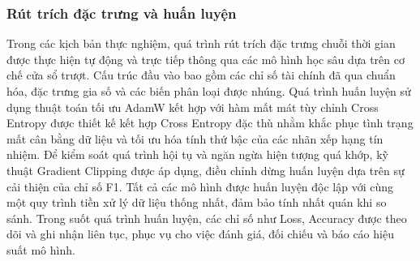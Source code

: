 \documentclass[10pt,twoside]{article}
\begin{document}
\subsubsection{Rút trích đặc trưng và huấn luyện}
Trong các kịch bản thực nghiệm, quá trình rút trích đặc trưng chuỗi thời gian được thực hiện tự động và trực tiếp thông qua các mô hình học sâu dựa trên cơ chế cửa sổ trượt. Cấu trúc đầu vào bao gồm các chỉ số tài chính đã qua chuẩn hóa, đặc trưng gia số và các biến phân loại được nhúng. Quá trình huấn luyện sử dụng thuật toán tối ưu AdamW kết hợp với hàm mất mát tùy chỉnh Cross Entropy được thiết kế kết hợp Cross Entropy đặc thù nhằm khắc phục tình trạng mất cân bằng dữ liệu và tối ưu hóa tính thứ bậc của các nhãn xếp hạng tín nhiệm. Để kiểm soát quá trình hội tụ và ngăn ngừa hiện tượng quá khớp, kỹ thuật Gradient Clipping được áp dụng, điều chỉnh dừng huấn luyện dựa trên sự cải thiện của chỉ số F1. Tất cả các mô hình được huấn luyện độc lập với cùng một quy trình tiền xử lý dữ liệu thống nhất, đảm bảo tính nhất quán khi so sánh. Trong suốt quá trình huấn luyện, các chỉ số như Loss, Accuracy được theo dõi và ghi nhận liên tục, phục vụ cho việc đánh giá, đối chiếu và báo cáo hiệu suất mô hình.
\end{document}
